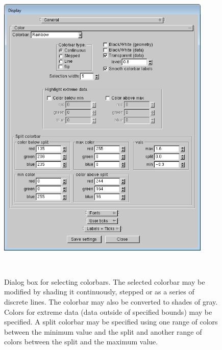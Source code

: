 \documentclass[11pt,twoside]{book}
\begin{document}
\begin{figure}[bph]
\centerline{\includegraphics[width=4.00694444in]{FIGURES/figDatacoloring}
}\ \caption [Dialog Box for selecting colorbars.] {Dialog
box for selecting colorbars.  The selected colorbar may be modified by
shading it continuously, stepped or as a series of discrete lines.  The
colorbar may also be converted to shades of gray.  Colors for
extreme data (data outside of specified bounds) may be specified.
A split colorbar may be specified using one range of colors between the minimum
value and the split and another range of colors between the split and the maximum value.}
\label{figDatacoloring}
\end{figure}
\end{document}

